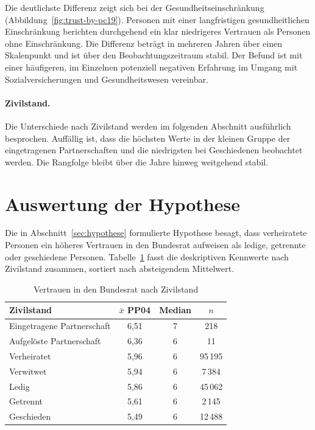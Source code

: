 Die deutlichste Differenz zeigt sich bei der Gesundheitseinschränkung (Abbildung~\ref{fig:trust-by-pc19}). Personen mit einer
langfristigen gesundheitlichen Einschränkung berichten durchgehend ein klar niedrigeres
Vertrauen als Personen ohne Einschränkung. Die Differenz beträgt in mehreren Jahren
über einen Skalenpunkt und ist über den Beobachtungszeitraum stabil. Der Befund ist mit
einer häufigeren, im Einzelnen potenziell negativen Erfahrung im Umgang mit
Sozialversicherungen und Gesundheitswesen vereinbar.

\paragraph{Zivilstand.}
Die Unterschiede nach Zivilstand werden im folgenden Abschnitt ausführlich besprochen.
Auffällig ist, dass die höchsten Werte in der kleinen Gruppe der eingetragenen
Partnerschaften und die niedrigsten bei Geschiedenen beobachtet werden. Die Rangfolge
bleibt über die Jahre hinweg weitgehend stabil.



\section{Auswertung der Hypothese}
\label{sec:hypothesenauswertung}

Die in Abschnitt~\ref{sec:hypothese} formulierte Hypothese besagt, dass verheiratete
Personen ein höheres Vertrauen in den Bundesrat aufweisen als ledige, getrennte oder
geschiedene Personen. Tabelle~\ref{tab:vertrauen_zivilstand} fasst die deskriptiven
Kennwerte nach Zivilstand zusammen, sortiert nach absteigendem Mittelwert.

\begin{table}[h]
\centering
\caption{Vertrauen in den Bundesrat nach Zivilstand}
\label{tab:vertrauen_zivilstand}
\begin{tabular}{lccc}
\toprule
Zivilstand & $\bar{x}$ PP04 & Median & $n$ \\
\midrule
Eingetragene Partnerschaft & 6{,}51 & 7 &     218 \\
Aufgelöste Partnerschaft   & 6{,}36 & 6 &      11 \\
Verheiratet                & 5{,}96 & 6 & 95\,195 \\
Verwitwet                  & 5{,}94 & 6 &  7\,384 \\
Ledig                      & 5{,}86 & 6 & 45\,062 \\
Getrennt                   & 5{,}61 & 6 &  2\,145 \\
Geschieden                 & 5{,}49 & 6 & 12\,488 \\
\bottomrule
\end{tabular}
\end{table}

